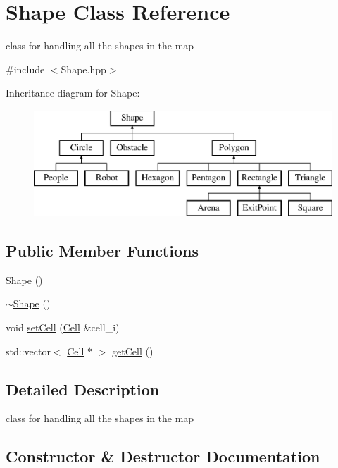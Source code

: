 \hypertarget{class_shape}{}\section{Shape Class Reference}
\label{class_shape}


class for handling all the shapes in the map  




{\ttfamily \#include $<$Shape.\+hpp$>$}

Inheritance diagram for Shape\+:\begin{figure}[H]
\begin{center}
\leavevmode
\includegraphics[height=4.000000cm]{class_shape}
\end{center}
\end{figure}
\subsection*{Public Member Functions}
\begin{DoxyCompactItemize}
\item 
\mbox{\hyperlink{class_shape_aaa8d87171e65e0d8ba3c5459978992a7}{Shape}} ()
\item 
\mbox{\hyperlink{class_shape_a935afc9e576015f967d90de56977167d}{$\sim$\+Shape}} ()
\item 
void \mbox{\hyperlink{class_shape_af40ad140cf111c7d50923fbe140da9ad}{set\+Cell}} (\mbox{\hyperlink{class_cell}{Cell}} \&cell\+\_\+i)
\item 
std\+::vector$<$ \mbox{\hyperlink{class_cell}{Cell}} $\ast$ $>$ \mbox{\hyperlink{class_shape_a6b721d81c8f21efe182682d8d7caf794}{get\+Cell}} ()
\end{DoxyCompactItemize}


\subsection{Detailed Description}
class for handling all the shapes in the map 

\subsection{Constructor \& Destructor Documentation}
\mbox{\label{class_shape_aaa8d87171e65e0d8ba3c5459978992a7}} 

